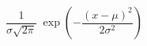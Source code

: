 \begin{displaymath}
\frac1{\sigma\sqrt{2\pi}}\; 
\exp\left(-\frac{\left(x-\mu\right)^2}{2\sigma^2} 
\right) \!
\end{displaymath}
